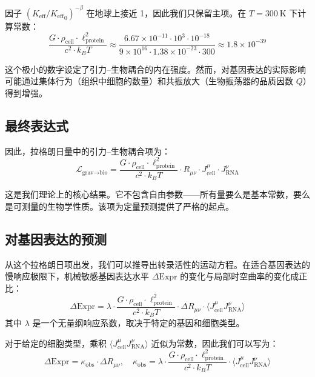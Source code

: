 \documentclass[12pt,a4paper]{article}
\theoremstyle{remark}
\newcommand{\Keff}{K_{\mathrm{eff}}}
\begin{document}
	因子 \((\Keff/{\Keff}_0)^{-\beta}\) 在地球上接近 1，因此我们只保留主项。在 \(T = 300\ \mathrm{K}\) 下计算常数：
	\[
	\frac{G \cdot \rho_{\text{cell}} \cdot \ell_{\text{protein}}^2}{c^2 \cdot k_B T} \approx \frac{6.67\times 10^{-11} \cdot 10^3 \cdot 10^{-18}}{9\times 10^{16} \cdot 1.38\times 10^{-23} \cdot 300} \approx 1.8 \times 10^{-39}
	\]
	
	这个极小的数字设定了引力–生物耦合的内在强度。然而，对基因表达的实际影响可能通过集体行为（组织中细胞的数量）和共振放大（生物振荡器的品质因数 \(Q\)）得到增强。
	
	\subsection{最终表达式}
	
	因此，拉格朗日量中的引力–生物耦合项为：
	\begin{equation}
		\boxed{ \mathcal{L}_{\text{grav}\to\text{bio}} = \frac{G \cdot \rho_{\text{cell}} \cdot \ell_{\text{protein}}^2}{c^2 \cdot k_B T} \cdot R_{\mu\nu} \cdot J_{\text{cell}}^\mu \cdot J_{\text{RNA}}^\nu }
		\label{eq:final}
	\end{equation}
	
	这是我们理论上的核心结果。它不包含自由参数——所有量要么是基本常数，要么是可测量的生物学性质。该项为定量预测提供了严格的起点。
	
	\subsection{对基因表达的预测}
	
	从这个拉格朗日项出发，我们可以推导出转录活性的运动方程。在适合基因表达的慢响应极限下，机械敏感基因表达水平 \(\Delta\text{Expr}\) 的变化与局部时空曲率的变化成正比：
	\begin{equation}
		\Delta\text{Expr} = \lambda \cdot \frac{G \cdot \rho_{\text{cell}} \cdot \ell_{\text{protein}}^2}{c^2 \cdot k_B T} \cdot \Delta R_{\mu\nu} \cdot \langle J_{\text{cell}}^\mu J_{\text{RNA}}^\nu \rangle
		\label{eq:prediction-raw}
	\end{equation}
	其中 \(\lambda\) 是一个无量纲响应系数，取决于特定的基因和细胞类型。
	
	对于给定的细胞类型，乘积 \(\langle J_{\text{cell}}^\mu J_{\text{RNA}}^\nu \rangle\) 近似为常数，因此我们可以写为：
	\begin{equation}
		\Delta\text{Expr} = \kappa_{\text{obs}} \cdot \Delta R_{\mu\nu}, \quad 
		\kappa_{\text{obs}} = \lambda \cdot \frac{G \cdot \rho_{\text{cell}} \cdot \ell_{\text{protein}}^2}{c^2 \cdot k_B T} \cdot \langle J_{\text{cell}}^\mu J_{\text{RNA}}^\nu \rangle
		\label{eq:prediction-simple}
	\end{equation}
	
\end{document}
